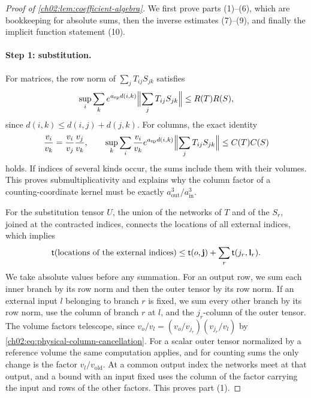\begin{proof}[Proof of \cref{ch02:lem:coefficient-algebra}]
We first prove parts (1)--(6), which are bookkeeping for absolute sums, then the inverse estimates (7)--(9), and finally the implicit function statement (10).

\paragraph{Step 1: substitution.} For matrices, the row norm of $\sum_jT_{ij}S_{jk}$ satisfies
\[
 \sup_i\sum_ke^{a_{\mathrm{sp}} d(i,k)}\Bigl\|\sum_jT_{ij}S_{jk}\Bigr\|\le R(T)R(S),
\]
since $d(i,k)\le d(i,j)+d(j,k)$. For columns, the exact identity
\begin{equation}\label{ch02:eq:physical-column-cancellation}
 \frac{v_i}{v_k}=\frac{v_i}{v_j}\frac{v_j}{v_k},\qquad
 \sup_k\sum_i\frac{v_i}{v_k}e^{a_{\mathrm{sp}} d(i,k)}\Bigl\|\sum_jT_{ij}S_{jk}\Bigr\|\le C(T)C(S)
\end{equation}
holds. If indices of several kinds occur, the sums include them with their volumes. This proves submultiplicativity and explains why the column factor of a counting-coordinate kernel must be exactly $a_{\mathrm{out}}^3/a_{\mathrm{in}}^3$.

For the substitution tensor $U$, the union of the networks of $T$ and of the $S_r$, joined at the contracted indices, connects the locations of all external indices, which implies
\[
 \mathsf t(\text{locations of the external indices})\le\mathsf t(o,\mathbf j)+\sum_r\mathsf t(j_r,\mathbf l_r).
\]
We take absolute values before any summation. For an output row, we sum each inner branch by its row norm and then the outer tensor by its row norm. If an external input $l$ belonging to branch $r$ is fixed, we sum every other branch by its row norm, use the column of branch $r$ at $l$, and the $j_r$-column of the outer tensor. The volume factors telescope, since $v_o/v_l=(v_o/v_{j_r})(v_{j_r}/v_l)$ by \eqref{ch02:eq:physical-column-cancellation}. For a scalar outer tensor normalized by a reference volume the same computation applies, and for counting sums the only change is the factor $v_l/v_{\mathrm{old}}$. At a common output index the networks meet at that output, and a bound with an input fixed uses the column of the factor carrying the input and rows of the other factors. This proves part (1).


\end{proof}
